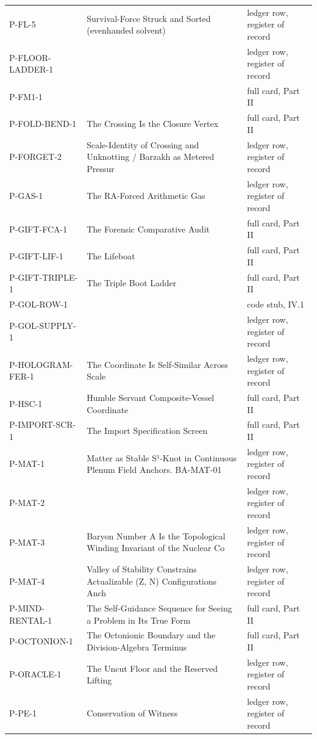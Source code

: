 \documentclass[10pt,twocolumn]{article}
\begin{document}
\begin{center}
\begin{longtable}{>{\raggedright\arraybackslash}p{}>{\raggedright\arraybackslash}p{}>{\raggedright\arraybackslash}p{}}
P-FL-5 & Survival-Force Struck and Sorted (evenhanded solvent) & ledger row, register of record \\
P-FLOOR-LADDER-1 &  & ledger row, register of record \\
P-FM1-1 &  & full card, Part II \\
P-FOLD-BEND-1 & The Crossing Is the Closure Vertex & full card, Part II \\
P-FORGET-2 & Scale-Identity of Crossing and Unknotting / Barzakh as Metered Pressur & ledger row, register of record \\
P-GAS-1 & The RA-Forced Arithmetic Gas & ledger row, register of record \\
P-GIFT-FCA-1 & The Forensic Comparative Audit & full card, Part II \\
P-GIFT-LIF-1 & The Lifeboat & full card, Part II \\
P-GIFT-TRIPLE-1 & The Triple Boot Ladder & full card, Part II \\
P-GOL-ROW-1 &  & code stub, IV.1 \\
P-GOL-SUPPLY-1 &  & ledger row, register of record \\
P-HOLOGRAM-FER-1 & The Coordinate Is Self-Similar Across Scale & ledger row, register of record \\
P-HSC-1 & Humble Servant Composite-Vessel Coordinate & full card, Part II \\
P-IMPORT-SCR-1 & The Import Specification Screen & full card, Part II \\
P-MAT-1 & Matter as Stable S¹-Knot in Continuous Plenum Field Anchors. BA-MAT-01 & ledger row, register of record \\
P-MAT-2 &  & ledger row, register of record \\
P-MAT-3 & Baryon Number A Is the Topological Winding Invariant of the Nuclear Co & ledger row, register of record \\
P-MAT-4 & Valley of Stability Constrains Actualizable (Z, N) Configurations Anch & ledger row, register of record \\
P-MIND-RENTAL-1 & The Self-Guidance Sequence for Seeing a Problem in Its True Form & full card, Part II \\
P-OCTONION-1 & The Octonionic Boundary and the Division-Algebra Terminus & full card, Part II \\
P-ORACLE-1 & The Uncut Floor and the Reserved Lifting & ledger row, register of record \\
P-PE-1 & Conservation of Witness & ledger row, register of record \\

\end{longtable}
\end{center}
\end{document}
